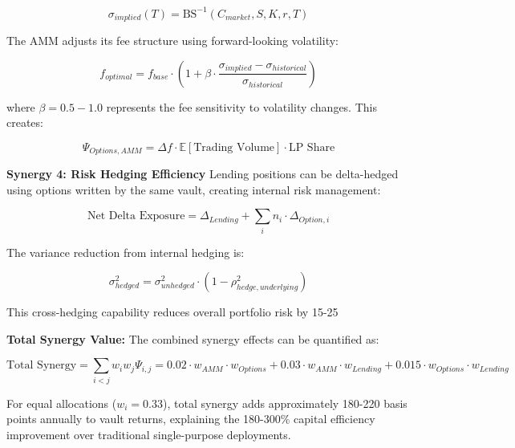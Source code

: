 \documentclass[12pt]{article}
\begin{document}
\begin{equation}
\sigma_{implied}(T) = \text{BS}^{-1}(C_{market}, S, K, r, T)
\end{equation}

The AMM adjusts its fee structure using forward-looking volatility:

\begin{equation}
f_{optimal} = f_{base} \cdot \left(1 + \beta \cdot \frac{\sigma_{implied} - \sigma_{historical}}{\sigma_{historical}}\right)
\end{equation}

where $\beta = 0.5-1.0$ represents the fee sensitivity to volatility changes. This creates:

\begin{equation}
\Psi_{Options,AMM} = \Delta f \cdot \mathbb{E}[\text{Trading Volume}] \cdot \text{LP Share}
\end{equation}

\textbf{Synergy 4: Risk Hedging Efficiency}
Lending positions can be delta-hedged using options written by the same vault, creating internal risk management:

\begin{equation}
\text{Net Delta Exposure} = \Delta_{Lending} + \sum_i n_i \cdot \Delta_{Option,i}
\end{equation}

The variance reduction from internal hedging is:

\begin{equation}
\sigma^2_{hedged} = \sigma^2_{unhedged} \cdot \left(1 - \rho^2_{hedge,underlying}\right)
\end{equation}

This cross-hedging capability reduces overall portfolio risk by 15-25%

\textbf{Total Synergy Value:}
The combined synergy effects can be quantified as:

\begin{equation}
\text{Total Synergy} = \sum_{i<j} w_i w_j \Psi_{i,j} = 0.02 \cdot w_{AMM} \cdot w_{Options} + 0.03 \cdot w_{AMM} \cdot w_{Lending} + 0.015 \cdot w_{Options} \cdot w_{Lending}
\end{equation}

For equal allocations ($w_i = 0.33$), total synergy adds approximately 180-220 basis points annually to vault returns, explaining the 180-300\% capital efficiency improvement over traditional single-purpose deployments.
\end{document}
